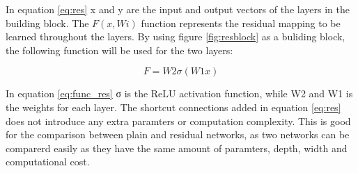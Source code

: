 In equation \ref{eq:res} x and y are the input and output vectors of the layers in the building block. The $F(x,{Wi})$ function represents the residual mapping to be learned throughout the layers. By using figure \ref{fig:resblock} as a buliding block, the following function will be used for the two layers: 

\begin{equation} \label{eq:func_res}
F = W2σ(W1x)
\end{equation} 

In equation \ref{eq:func_res} σ is the ReLU activation function, while W2 and W1 is the weights for each layer. The shortcut connections added in equation \ref{eq:res} does not introduce any extra paramters or computation complexity. This is good for the comparison between plain and residual networks, as two networks can be comparerd easily as they have the same amount of paramters, depth, width and computational cost.